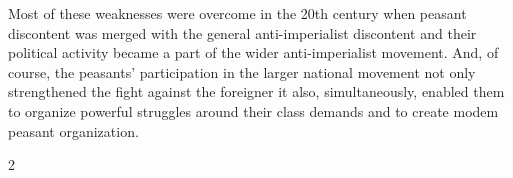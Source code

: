 \begin{multicols}{2}
Most of these weaknesses were overcome in the 20th century when peasant discontent was merged with the general anti-imperialist discontent and their political activity became a part of the wider anti-imperialist movement. And, of course, the peasants' participation in the larger national movement not only strengthened the fight against the foreigner it also, simultaneously, enabled them to organize powerful struggles around their class demands and to create modem peasant organization.
\end{multicols}{2}

